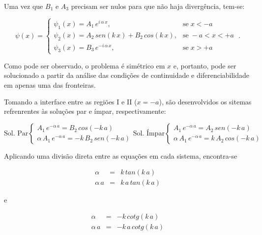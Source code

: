 \noindent Uma vez que $B_1$ e $A_3$ precisam ser nulos para que não haja
divergência, tem-se:

\begin{equation}
	\psi(x) =
	\begin{cases}
		\psi_{1}(x) = A_1\,e^{i\,\alpha\,x},
		 & \mbox{se}\;x<-a    \\
		\psi_{2}(x) = A_2\,sen(k\,x) + B_2\,cos(k\,x),
		 & \mbox{se}\;-a<x<+a \\
		\psi_{3}(x) = B_3\,e^{-i\,\alpha\,x},
		 & \mbox{se}\;x>+a
	\end{cases}\;.
\end{equation}

Como pode ser observado, o problema é simétrico em $x$ e, portanto, pode ser
solucionado a partir da análise das condições de continuidade
e diferenciabilidade em apenas uma das fronteiras.

Tomando a interface entre as regiões I e II ($x=-a$), são desenvolvidos os
sitemas refrenrentes às soluções par e ímpar, respectivamente:

\begin{equation}
	\mbox{Sol. Par}
	\begin{cases}
		A_1\,e^{-\alpha\,a} = B_2\,cos(-k\,a) \\
		\alpha\,A_1\,e^{-\alpha\,a} = -k\,B_2\,sen(-k\,a)
	\end{cases}
	\mbox{Sol. Ímpar}
	\begin{cases}
		A_1\,e^{-\alpha\,a} = A_2\,sen(-k\,a) \\
		\alpha\,A_1\,e^{-\alpha\,a} = k\,A_2\,cos(-k\,a)
	\end{cases}
\end{equation}

\noindent Aplicando uma divisão direta entre as equações em cada sistema,
encontra-se

\begin{equation}
	\begin{array}{lcl}
		\alpha    & = & k\,tan(k\,a)    \\
		\alpha\,a & = & k\,a\,tan(k\,a)
	\end{array}
\end{equation}

\noindent e

\begin{equation}
	\begin{array}{lcl}
		\alpha    & = & -k\,cotg(k\,a)    \\
		\alpha\,a & = & -k\,a\,cotg(k\,a)
	\end{array}
\end{equation}

